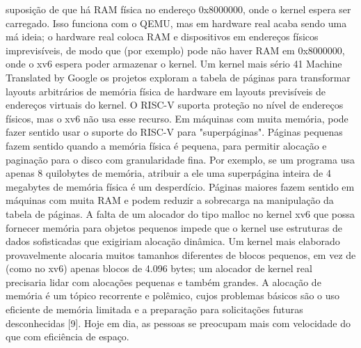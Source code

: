 suposição  de  que  há  RAM  física  no  endereço  0x8000000,  onde  o  kernel  espera  ser  carregado.  Isso  funciona  com  o  QEMU,  
mas  em  hardware  real  acaba  sendo  uma  má  ideia;  o  hardware  real  coloca  RAM  e  dispositivos  em  endereços  físicos  
imprevisíveis,  de  modo  que  (por  exemplo)  pode  não  haver  RAM  em  0x8000000,  onde  o  xv6  espera  poder  armazenar  o  
kernel.  Um  kernel  mais  sério
 41
Machine Translated by Google
 os  projetos  exploram  a  tabela  de  páginas  para  transformar  layouts  arbitrários  de  memória  física  de  hardware  em  layouts  previsíveis  
de  endereços  virtuais  do  kernel.
 O  RISC-V  suporta  proteção  no  nível  de  endereços  físicos,  mas  o  xv6  não  usa  esse  recurso.
 Em  máquinas  com  muita  memória,  pode  fazer  sentido  usar  o  suporte  do  RISC-V  para  "superpáginas".  Páginas  pequenas  
fazem  sentido  quando  a  memória  física  é  pequena,  para  permitir  alocação  e  paginação  para  o  disco  com  granularidade  fina.  Por  
exemplo,  se  um  programa  usa  apenas  8  quilobytes  de  memória,  atribuir  a  ele  uma  superpágina  inteira  de  4  megabytes  de  memória  
física  é  um  desperdício.  Páginas  maiores  fazem  sentido  em  máquinas  com  muita  RAM  e  podem  reduzir  a  sobrecarga  na  manipulação  
da  tabela  de  páginas.
 A  falta  de  um  alocador  do  tipo  malloc  no  kernel  xv6  que  possa  fornecer  memória  para  objetos  pequenos  impede  que  o  kernel  
use  estruturas  de  dados  sofisticadas  que  exigiriam  alocação  dinâmica.
 Um  kernel  mais  elaborado  provavelmente  alocaria  muitos  tamanhos  diferentes  de  blocos  pequenos,  em  vez  de  (como  no  xv6)  
apenas  blocos  de  4.096  bytes;  um  alocador  de  kernel  real  precisaria  lidar  com  alocações  pequenas  e  também  grandes.
 A  alocação  de  memória  é  um  tópico  recorrente  e  polêmico,  cujos  problemas  básicos  são  o  uso  eficiente  de  memória  limitada  e  
a  preparação  para  solicitações  futuras  desconhecidas  [9].  Hoje  em  dia,  as  pessoas  se  preocupam  mais  com  velocidade  do  que  com  
eficiência  de  espaço.
